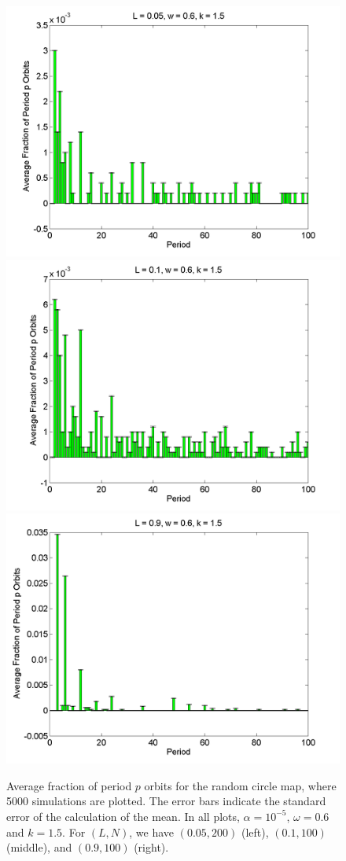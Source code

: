 \begin{figure}[H]\linespread{1}
\caption[Average fraction of period $p$ orbits for the random circle
map (normal distribution), for $\alpha=10^{-5}$, $\omega=0.6$ and $k=1.5$]{Average fraction of period $p$ orbits for the random circle
map, where 5000 simulations are plotted. The error bars indicate
the standard error of the calculation of the mean. In all plots,
$\alpha = 10^{-5}$, $\omega=0.6$ and $k=1.5$. For $(L,N)$,
we have $(0.05, 200)$ (left), $(0.1, 100)$
(middle), and $(0.9, 100)$ (right).}\label{fig:rcirchist_n2}
	\begin{center}	\includegraphics[width=.33\textwidth]{figs/rcirc_hist_n_L_005_w_06_k_15_sims_5000.png}\hfill
\includegraphics[width=.33\textwidth]{figs/rcirc_hist_n_L_01_w_06_k_15_sims_5000.png}\hfill
\includegraphics[width=.33\textwidth]{figs/rcirc_hist_n_L_09_w_06_k_15_sims_5000.png}
	\end{center}
\end{figure}

